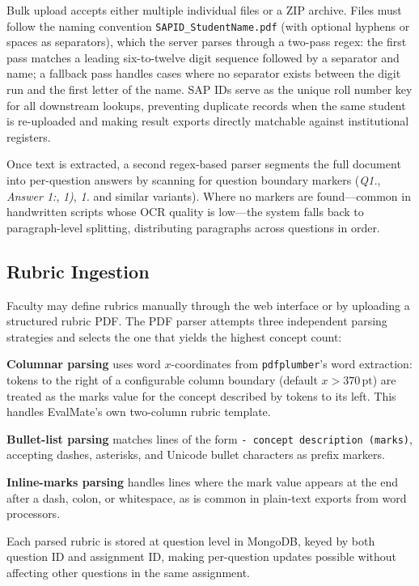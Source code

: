 \documentclass[conference]{IEEEtran}
\begin{document}
Bulk upload accepts either multiple individual files or a ZIP
archive. Files must follow the naming convention
\texttt{SAPID\_StudentName.pdf} (with optional hyphens or spaces as
separators), which the server parses through a two-pass regex:
the first pass matches a leading six-to-twelve digit sequence
followed by a separator and name; a fallback pass handles cases
where no separator exists between the digit run and the first
letter of the name. SAP IDs serve as the unique roll number key
for all downstream lookups, preventing duplicate records when
the same student is re-uploaded and making result exports
directly matchable against institutional registers.

Once text is extracted, a second regex-based parser segments the
full document into per-question answers by scanning for question
boundary markers (\textit{Q1.}, \textit{Answer 1:},
\textit{1)}, \textit{1.} and similar variants). Where no markers
are found---common in handwritten scripts whose OCR quality is
low---the system falls back to paragraph-level splitting,
distributing paragraphs across questions in order.

\subsection{Rubric Ingestion}

Faculty may define rubrics manually through the web interface or
by uploading a structured rubric PDF. The PDF parser attempts
three independent parsing strategies and selects the one that
yields the highest concept count:

\noindent\textbf{Columnar parsing} uses word $x$-coordinates
from \texttt{pdfplumber}'s word extraction: tokens to the right
of a configurable column boundary (default $x > 370\,\text{pt}$)
are treated as the marks value for the concept described by tokens
to its left. This handles EvalMate's own two-column rubric template.

\noindent\textbf{Bullet-list parsing} matches lines of the form
\texttt{- concept description (marks)}, accepting dashes,
asterisks, and Unicode bullet characters as prefix markers.

\noindent\textbf{Inline-marks parsing} handles lines where the
mark value appears at the end after a dash, colon, or whitespace,
as is common in plain-text exports from word processors.

Each parsed rubric is stored at question level in MongoDB, keyed
by both question ID and assignment ID, making per-question updates
possible without affecting other questions in the same assignment.
\end{document}
